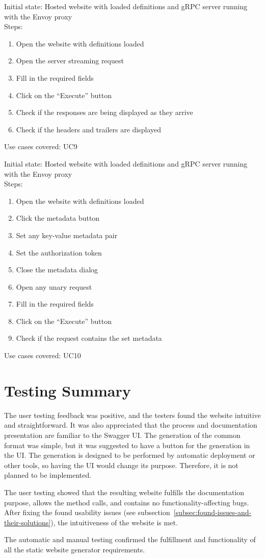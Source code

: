 Initial state: Hosted website with loaded definitions and gRPC server running with the Envoy proxy\\
Steps:
\begin{enumerate}
    \item Open the website with definitions loaded
    \item Open the server streaming request
    \item Fill in the required fields
    \item Click on the \enquote{Execute} button
    \item Check if the responses are being displayed as they arrive
    \item Check if the headers and trailers are displayed
\end{enumerate}
Use cases covered: UC9

Initial state: Hosted website with loaded definitions and gRPC server running with the Envoy proxy\\
Steps:
\begin{enumerate}
    \item Open the website with definitions loaded
    \item Click the metadata button
    \item Set any key-value metadata pair
    \item Set the authorization token
    \item Close the metadata dialog
    \item Open any unary request
    \item Fill in the required fields
    \item Click on the \enquote{Execute} button
    \item Check if the request contains the set metadata
\end{enumerate}
Use cases covered: UC10





\section{Testing Summary}
The user testing feedback was positive, and the testers found the website intuitive and straightforward.
It was also appreciated that the process and documentation presentation are familiar to the Swagger UI\@.
The generation of the common format was simple, but it was suggested to have a button for the generation in the UI\@.
The generation is designed to be performed by automatic deployment or other tools, so having the UI would change its purpose.
Therefore, it is not planned to be implemented.

The user testing showed that the resulting website fulfills the documentation purpose, allows the method calls, and contains no functionality-affecting bugs.
After fixing the found usability issues (see subsection~\ref{subsec:found-issues-and-their-solutions}), the intuitiveness of the website is met.

The automatic and manual testing confirmed the fulfillment and functionality of all the static website generator requirements.